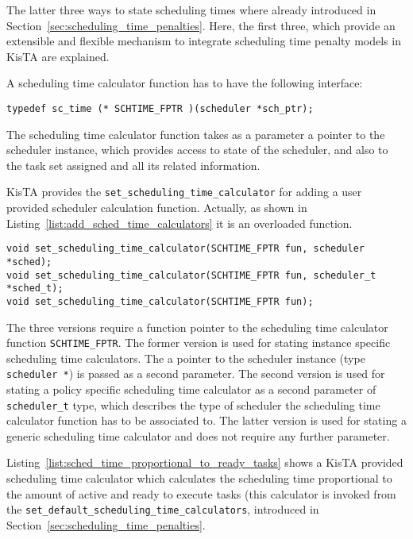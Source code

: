 The latter three ways to state scheduling times where already introduced in Section~\ref{sec:scheduling_time_penalties}.
Here, the first three, which provide an extensible and flexible mechanism to integrate scheduling time penalty models in KisTA
are explained.

A scheduling time calculator function has to have the following interface:

\begin{lstlisting}[style=KistaCodeStyle,caption={Prototype of a scheduling time calculator function.},label=list:sched_time_calculator_if]
typedef sc_time (* SCHTIME_FPTR )(scheduler *sch_ptr);
\end{lstlisting}

The scheduling time calculator function takes as a parameter a pointer to the scheduler instance,
which provides access to state of the scheduler, and also to the task set assigned and all its related information.

KisTA provides the \texttt{set\_scheduling\_time\_calculator} for adding a user provided scheduler calculation function.
Actually, as shown in Listing~\ref{list:add_sched_time_calculators} it is an overloaded function.

\begin{lstlisting}[style=KistaCodeStyle,caption={API to provide scheduling time calculators.},label=list:add_sched_time_calculators]
void set_scheduling_time_calculator(SCHTIME_FPTR fun, scheduler *sched);
void set_scheduling_time_calculator(SCHTIME_FPTR fun, scheduler_t *sched_t);
void set_scheduling_time_calculator(SCHTIME_FPTR fun);
\end{lstlisting}

The three versions require a function pointer to the scheduling time calculator function \texttt{SCHTIME\_FPTR}.
The former version is used for stating instance specific scheduling time calculators.
The a pointer to the scheduler instance (type \texttt{scheduler *}) is passed as a second parameter.
%
The second version is used for stating a policy specific scheduling time calculator
as a second parameter of \texttt{scheduler\_t} type, which describes the type of scheduler
the scheduling time calculator function has to be associated to.
%
The latter version is used for stating a generic scheduling time calculator and does not require any further parameter.

Listing~\ref{list:sched_time_proportional_to_ready_tasks} shows a KisTA provided scheduling time calculator
which calculates the scheduling time proportional to the amount of active and ready to execute tasks
(this calculator is invoked from the \texttt{set\_default\_scheduling\_time\_calculators}, introduced in Section~\ref{sec:scheduling_time_penalties}.

